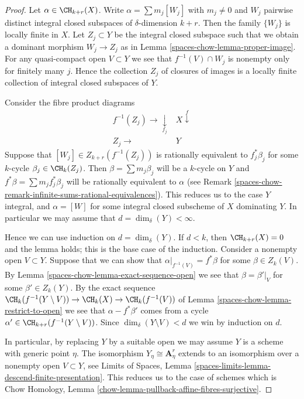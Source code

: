 \begin{proof}
Let $\alpha \in \CH_{k + r}(X)$. Write $\alpha = \sum m_j[W_j]$ with
$m_j \not = 0$ and $W_j$ pairwise distinct integral closed subspaces of
$\delta$-dimension $k + r$. Then the family $\{W_j\}$
is locally finite in $X$. Let $Z_j \subset Y$ be the integral
closed subspace such that we obtain a dominant morphism $W_j \to Z_j$
as in Lemma \ref{spaces-chow-lemma-proper-image}. For any quasi-compact open
$V \subset Y$ we see that $f^{-1}(V) \cap W_j$
is nonempty only for finitely many $j$. Hence the
collection $Z_j$ of closures of images is a locally finite collection
of integral closed subspaces of $Y$.

\medskip\noindent
Consider the fibre product diagrams
$$
\begin{array}{cc}f^{-1}(Z_j) \longrightarrow\underset{f_j}{\downarrow} & X \overset{f}{\downarrow} \\ Z_j \longrightarrow & Y\end{array}
$$
Suppose that $[W_j] \in Z_{k + r}(f^{-1}(Z_j))$
is rationally equivalent to $f_j^*\beta_j$ for some
$k$-cycle $\beta_j \in \CH_k(Z_j)$. Then
$\beta = \sum m_j \beta_j$ will be a $k$-cycle on $Y$
and $f^*\beta = \sum m_j f_j^*\beta_j$ will be rationally
equivalent to $\alpha$ (see
Remark \ref{spaces-chow-remark-infinite-sums-rational-equivalences}).
This reduces us to the case $Y$ integral, and
$\alpha = [W]$ for some integral closed subscheme
of $X$ dominating $Y$. In particular we may
assume that $d = \dim_\delta(Y) < \infty$.

\medskip\noindent
Hence we can use induction on $d = \dim_\delta(Y)$.
If $d < k$, then $\CH_{k + r}(X) = 0$ and the lemma holds;
this is the base case of the induction.
Consider a nonempty open $V \subset Y$.
Suppose that we can show that $\alpha|_{f^{-1}(V)} = f^*\beta$
for some $\beta \in Z_k(V)$. By Lemma \ref{spaces-chow-lemma-exact-sequence-open}
we see that
$\beta = \beta'|_V$ for some $\beta' \in Z_k(Y)$.
By the exact sequence
$\CH_k(f^{-1}(Y \setminus V)) \to \CH_k(X) \to \CH_k(f^{-1}(V))$
of Lemma \ref{spaces-chow-lemma-restrict-to-open}
we see that $\alpha - f^*\beta'$ comes from
a cycle $\alpha' \in \CH_{k + r}(f^{-1}(Y \setminus V))$.
Since $\dim_\delta(Y \setminus V) < d$ we win by
induction on $d$.

\medskip\noindent
In particular, by replacing $Y$ by a suitable open we may assume
$Y$ is a scheme with generic point $\eta$. The isomorphism
$Y_\eta \cong \mathbf{A}^r_\eta$ extends to an isomorphism
over a nonempty open $V \subset Y$, see
Limits of Spaces, Lemma \ref{spaces-limits-lemma-descend-finite-presentation}.
This reduces us to the case of schemes which is
Chow Homology, Lemma \ref{chow-lemma-pullback-affine-fibres-surjective}.
\end{proof}

